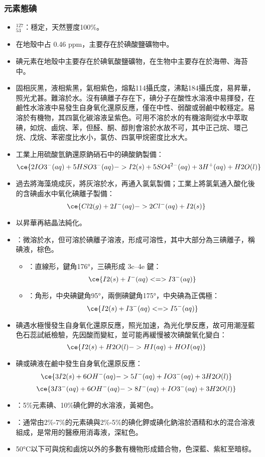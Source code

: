 \documentclass[a4paper,12pt]{report}
\begin{document}
\subsubsection{元素態碘}
\begin{itemize}
\item $^{127}_{53}$\rmI：穩定，天然豐度100\%。
\item 在地殼中占 0.46 ppm，主要存在於碘酸鹽礦物中。
\item 碘元素在地殼中主要存在於碘氧酸鹽礦物，在生物中主要存在於海帶、海苔中。
\item 固相灰黑，液相紫黑，氣相紫色，熔點114攝氏度，沸點184攝氏度，易昇華，照光尤甚。難溶於水。沒有碘離子存在下，碘分子在酸性水溶液中易揮發，在鹼性水溶液中易發生自身氧化還原反應，僅在中性、弱酸或弱鹼中較穩定。易溶於有機物，其四氯化碳溶液呈紫色。可用不溶於水的有機溶劑從水中萃取碘，如烷、鹵烷、苯，但醛、酮、醇則會溶於水故不可，其中正己烷、環己烷、戊烷、苯密度比水小，氯仿、四氯甲烷密度比水大。
\item 工業上用硫酸氫鈉還原鈉硝石中的碘酸鈉製備：
\[\ce{2IO3^-(aq) + 5HSO3^-(aq) -> I2(s) + 5SO4^{2-}(aq) + 3H^+(aq) + H2O(l)}\]
\item 過去將海藻燒成灰，將灰溶於水，再通入氯氣製備；工業上將氯氣通入酸化後的含碘鹵水中氧化碘離子製備：
\[\ce{Cl2(g) + 2I^-(aq) -> 2Cl^-(aq) + I2(s)}\]
\item 以昇華再結晶法純化。
\item {}：微溶於水，但可溶於碘離子溶液，形成可溶性，其中大部分為三碘離子，稱碘液，棕色。
\begin{itemize}
\item {}：直線形，鍵角176°，三碘形成 3c–4e 鍵：
\[\ce{I2(s) + I^-(aq) <=> I3^-(aq)}\]
\item {}：角形，中央碘鍵角95°，兩側碘鍵角175°，中央碘為正偶極：
\[\ce{I2(s) + I3^-(aq) <=> I5^-(aq)}\]
\end{itemize}
\item 碘遇水極慢發生自身氧化還原反應，照光加速，為光化學反應，故可用潮溼藍色石蕊試紙檢驗，先因酸而變紅，並可能再緩慢被次碘酸氧化變白：
\[\ce{I2(s) + H2O(l) -> HI(aq) + HOI(aq)}\]
\item 碘或碘液在鹼中發生自身氧化還原反應：
\[\ce{3I2(s) + 6OH^-(aq) -> 5I^-(aq) + IO3^-(aq) + 3H2O(l)}\]
\[\ce{3I3^-(aq) + 6OH^-(aq) -> 8I^-(aq) + IO3^-(aq) + 3H2O(l)}\]
\item {}：5\%元素碘、10\%碘化鉀的水溶液，黃褐色。
\item {}：通常由2\%-7\%的元素碘與2\%-5\%的碘化鉀或碘化鈉溶於酒精和水的混合溶液組成，是常用的醫療用消毒液，深紅色。
\item 50°C以下可與烷和鹵烷以外的多數有機物形成錯合物，色深藍、紫紅至暗棕。
\end{itemize}
\end{document}

